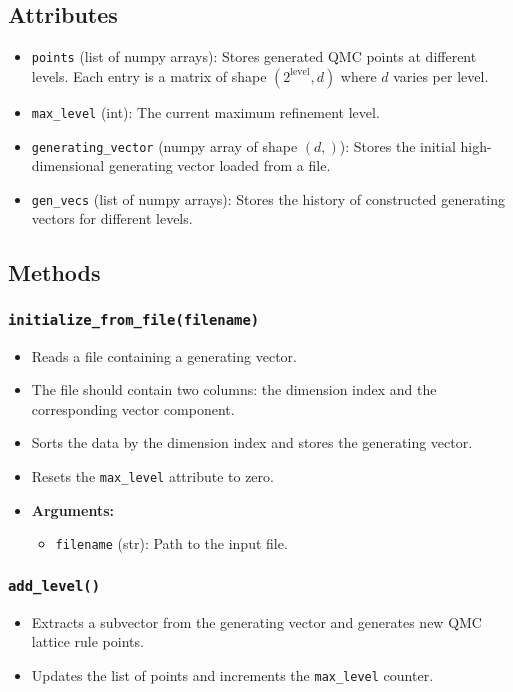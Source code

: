 \documentclass{article}
\begin{document}
\subsection{Attributes}
\begin{itemize}
    \item \texttt{points} (list of numpy arrays): Stores generated QMC points at different levels. Each entry is a matrix of shape $(2^{\text{level}}, d)$ where $d$ varies per level.
    \item \texttt{max\_level} (int): The current maximum refinement level.
    \item \texttt{generating\_vector} (numpy array of shape $(d,)$): Stores the initial high-dimensional generating vector loaded from a file.
    \item \texttt{gen\_vecs} (list of numpy arrays): Stores the history of constructed generating vectors for different levels.
\end{itemize}

\subsection{Methods}

\subsubsection{\texttt{initialize\_from\_file(filename)}}
\begin{itemize}
    \item Reads a file containing a generating vector.
    \item The file should contain two columns: the dimension index and the corresponding vector component.
    \item Sorts the data by the dimension index and stores the generating vector.
    \item Resets the \texttt{max\_level} attribute to zero.
    \item \textbf{Arguments:}
    \begin{itemize}
        \item \texttt{filename} (str): Path to the input file.
    \end{itemize}
\end{itemize}

\subsubsection{\texttt{add\_level()}}
\begin{itemize}
    \item Extracts a subvector from the generating vector and generates new QMC lattice rule points.
    \item Updates the list of points and increments the \texttt{max\_level} counter.
\end{itemize}
\end{document}
